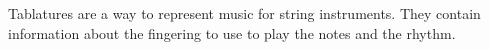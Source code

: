 \documentclass[11pt, a4paper]{article}
\begin{document}
Tablatures are a way to represent music for string instruments. They contain information about the fingering to use to play the notes and the rhythm.








\newpage

\printbibliography%
\end{document}
